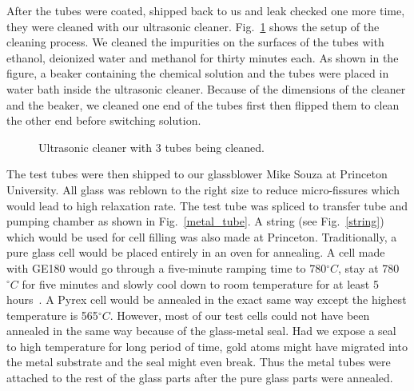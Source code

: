 After the tubes were coated, shipped back to us and leak checked one more time, they were cleaned with our ultrasonic cleaner. Fig.~\ref{ultrasonic_cleaner} shows the setup of the cleaning process. We cleaned the impurities on the surfaces of the tubes with ethanol, deionized water and methanol for thirty minutes each. As shown in the figure, a beaker containing the chemical solution and the tubes were placed in water bath inside the ultrasonic cleaner. Because of the dimensions of the cleaner and the beaker, we cleaned one end of the tubes first then flipped them to clean the other end before switching solution.

\begin{figure}[H]
	\centering
	\caption{{Ultrasonic cleaner with 3 tubes being cleaned.}}
	\label{ultrasonic_cleaner}
\end{figure}

The test tubes were then shipped to our glassblower Mike Souza at Princeton University. All glass was reblown to the right size to reduce micro-fissures which would lead to high relaxation rate. The test tube was spliced to transfer tube and pumping chamber as shown in Fig.~\ref{metal_tube}. A string (see Fig.~\ref{string}) which would be used for cell filling was also made at Princeton. Traditionally, a pure glass cell would be placed entirely in an oven for annealing. A cell made with GE180 would go through a five-minute ramping time to 780$^{\circ}C$, stay at 780$^{\circ}C$ for five minutes and slowly cool down to room temperature for at least 5 hours~\cite{DanThesis}. A Pyrex cell would be annealed in the exact same way except the highest temperature is 565$^{\circ}C$. However, most of our test cells could not have been annealed in the same way because of the glass-metal seal. Had we expose a seal to high temperature for long period of time, gold atoms might have migrated into the metal substrate and the seal might even break. Thus the metal tubes were attached to the rest of the glass parts after the pure glass parts were annealed. 


